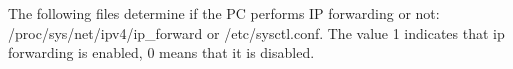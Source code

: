 The following files determine if the PC performs IP forwarding or not: /proc/sys/net/ipv4/ip\_forward or /etc/sysctl.conf. The value 1 indicates that ip forwarding is enabled, 0 means that it is disabled.